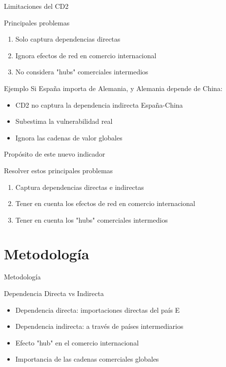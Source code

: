 \documentclass{beamer}
\begin{document}
\begin{frame}{Limitaciones del CD2}
    \begin{block}{Principales problemas}
        \begin{enumerate}
            \item Solo captura dependencias directas
            \item Ignora efectos de red en comercio internacional
            \item No considera "hubs" comerciales intermedios
        \end{enumerate}
    \end{block}
    
    \begin{block}{Ejemplo}
        Si España importa de Alemania, y Alemania depende de China:
        \begin{itemize}
            \item CD2 no captura la dependencia indirecta España-China
            \item Subestima la vulnerabilidad real
            \item Ignora las cadenas de valor globales
        \end{itemize}
    \end{block}
\end{frame}

\begin{frame}{Propósito de este nuevo indicador}
    \begin{block}{Resolver estos principales problemas}
        \begin{enumerate}
            \item Captura dependencias directas e indirectas
            \item Tener en cuenta los efectos de red en comercio internacional
            \item Tener en cuenta los "hubs" comerciales intermedios
        \end{enumerate}
    \end{block}
\end{frame}

\section{Metodología}
\begin{frame}
    \centering
    \Huge{Metodología}
\end{frame}

\begin{frame}{Dependencia Directa vs Indirecta}
    \begin{itemize}
        \item Dependencia directa: importaciones directas del país E
        \item Dependencia indirecta: a través de países intermediarios
        \item Efecto "hub" en el comercio internacional
        \item Importancia de las cadenas comerciales globales
    \end{itemize}
\end{frame}
\end{document}
